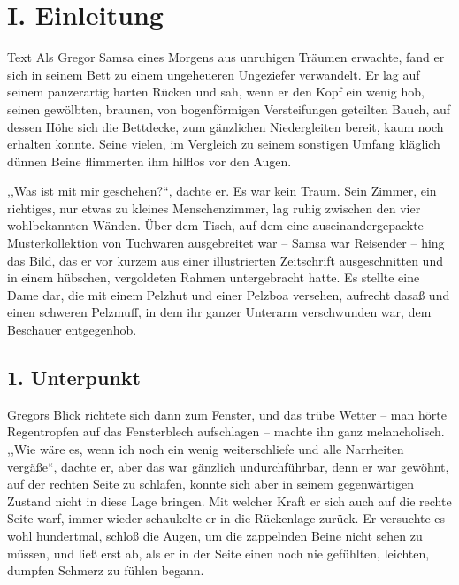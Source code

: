 \documentclass[]{zchinr}
\begin{document}

\zchinrprinttitle

\section{I. Einleitung}

Text Als Gregor Samsa eines Morgens aus unruhigen Träumen erwachte, fand er sich in seinem Bett zu einem ungeheueren Ungeziefer verwandelt. Er lag auf seinem panzerartig harten Rücken und sah, wenn er den Kopf ein wenig hob, seinen gewölbten, braunen, von bogenförmigen Versteifungen geteilten Bauch, auf dessen Höhe sich die Bettdecke, zum gänzlichen Niedergleiten bereit, kaum noch erhalten konnte. Seine vielen, im Vergleich zu seinem sonstigen Umfang kläglich dünnen Beine flimmerten ihm hilflos vor den Augen.

,,Was ist mit mir geschehen?{}``, dachte er. Es war kein Traum. Sein Zimmer, ein richtiges, nur etwas zu kleines Menschenzimmer, lag ruhig zwischen den vier wohlbekannten Wänden. Über dem Tisch, auf dem eine auseinandergepackte Musterkollektion von Tuchwaren ausgebreitet war -- Samsa war Reisender -- hing das Bild, das er vor kurzem aus einer illustrierten Zeitschrift ausgeschnitten und in einem hübschen, vergoldeten Rahmen untergebracht hatte. Es stellte eine Dame dar, die mit einem Pelzhut und einer Pelzboa versehen, aufrecht dasaß und einen schweren Pelzmuff, in dem ihr ganzer Unterarm verschwunden war, dem Beschauer entgegenhob.

\subsection{1. Unterpunkt}

Gregors Blick richtete sich dann zum Fenster, und das trübe Wetter -- man hörte Regentropfen auf das Fensterblech aufschlagen -- machte ihn ganz melancholisch. ,,Wie wäre es, wenn ich noch ein wenig weiterschliefe und alle Narrheiten vergäße``, dachte er, aber das war gänzlich undurchführbar, denn er war gewöhnt, auf der rechten Seite zu schlafen, konnte sich aber in seinem gegenwärtigen Zustand nicht in diese Lage bringen. Mit welcher Kraft er sich auch auf die rechte Seite warf, immer wieder schaukelte er in die Rückenlage zurück. Er versuchte es wohl hundertmal, schloß die Augen, um die zappelnden Beine nicht sehen zu müssen, und ließ erst ab, als er in der Seite einen noch nie gefühlten, leichten, dumpfen Schmerz zu fühlen begann.
\end{document}
